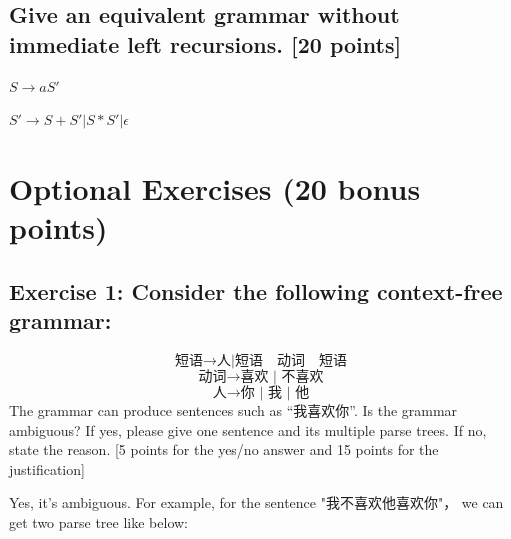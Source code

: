 \documentclass{article}
\begin{document}
        \subsection{Give an equivalent grammar without immediate left recursions. [20 points]}
            $S\rightarrow aS'$

            $S'\rightarrow S+S'|S*S'|\epsilon$    
    
    \section{Optional Exercises (20 bonus points)}
        \subsection{Exercise 1: Consider the following context-free grammar:}
            $$\text{短语}\rightarrow \text{人|短语}\quad\text{动词}\quad\text{短语}$$
            $$\text{动词} \rightarrow \text{喜欢 | 不喜欢} $$
            $$\text{人}\rightarrow \text{你 | 我 | 他}$$
            The grammar can produce sentences such as “我喜欢你”. Is the grammar ambiguous? If yes,
            please give one sentence and its multiple parse trees. If no, state the reason. [5 points for
            the yes/no answer and 15 points for the justification]
            
            Yes, it's ambiguous.
            For example, for the sentence "我不喜欢他喜欢你"， we can get two parse tree like below:
\end{document}
